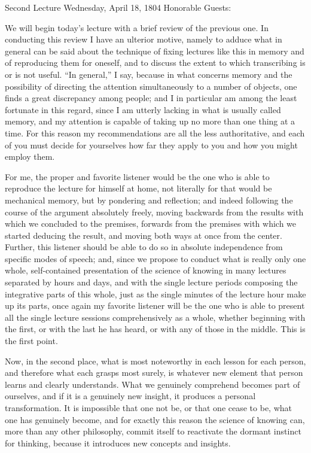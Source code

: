 Second Lecture
Wednesday, April 18, 1804
Honorable Guests:

We will begin today's lecture with
a brief review of the previous one.
In conducting this review I have an ulterior motive,
namely to adduce what in general can be said about
the technique of fixing lectures like this in memory
and of reproducing them for oneself,
and to discuss the extent to which
transcribing is or is not useful.
“In general,” I say, because in what concerns memory
and the possibility of directing the attention
simultaneously to a number of objects,
one finds a great discrepancy among people;
and I in particular am among the least fortunate in this regard,
since I am utterly lacking in what is usually called memory,
and my attention is capable of taking up no more than one thing at a time.
For this reason my recommendations are all the less authoritative,
and each of you must decide for yourselves how far they apply to you
and how you might employ them.

For me, the proper and favorite listener would be the one who is able to
reproduce the lecture for himself at home, not literally
for that would be mechanical memory, but by pondering and reflection;
and indeed following the course of the argument absolutely freely,
moving backwards from the results with which we concluded to the premises,
forwards from the premises with which we started deducing the result,
and moving both ways at once from the center.
Further, this listener should be able to do so in absolute independence
from specific modes of speech; and, since we propose to conduct
what is really only one whole, self-contained presentation of
the science of knowing in many lectures separated by hours and days,
and with the single lecture periods composing the integrative parts
of this whole, just as the single minutes of the lecture hour make up its parts,
once again my favorite listener will be the one who is able to present
all the single lecture sessions comprehensively as a whole,
whether beginning with the first, or with the last he has heard,
or with any of those in the middle.
This is the first point.

Now, in the second place, what is most noteworthy in each lesson
for each person, and therefore what each grasps most surely, is
whatever new element that person learns and clearly understands.
What we genuinely comprehend becomes part of ourselves, and
if it is a genuinely new insight, it produces a personal transformation.
It is impossible that one not be, or that one cease to be,
what one has genuinely become, and for exactly this reason
the science of knowing can, more than any other philosophy,
commit itself to reactivate the dormant instinct for thinking,
because it introduces new concepts and insights.

